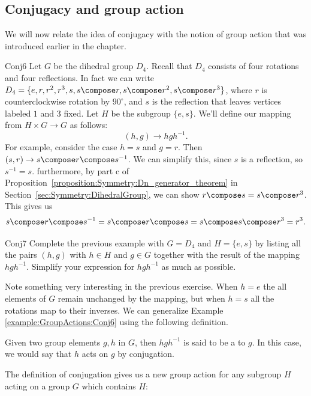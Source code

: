 \subsection{Conjugacy and group action}
\label{subsec:GroupActions:Conjugation:ConjugacyAndGroupAction}

We will now relate the idea of conjugacy with the notion of group action that was introduced earlier in the chapter.


\begin{example}{Conj6}
Let $G$ be the dihedral group $D_4$.  Recall that $D_4$ consists of four rotations and four reflections.  In fact we can write $D_4=\{e, r, r^2, r^3, s,s\compose r,s\compose r^2,s\compose r^3\}$, where $r$ is counterclockwise rotation by $90^{\circ}$, and $s$ is the reflection that leaves vertices labeled $1$ and $3$ fixed.  Let $H$ be the subgroup $\{e,s\}$.  
We'll define our mapping from $H\times G \rightarrow G$ as follows:
$$(h,g) \rightarrow hgh^{-1}. $$
For example, consider the case $h=s$ and $g=r$. Then $(s,r) \rightarrow s\compose r \compose s^{-1}$.  We can simplify this, since $s$ is a reflection, so $s^{-1}=s$.  furthermore, by part c of Proposition~\ref{proposition:Symmetry:Dn_generator_theorem}  in Section~\ref{sec:Symmetry:DihedralGroup}, we can show $r\compose s =s\compose r^3$.  This gives us
$$ s\compose r\compose s^{-1}=s\compose r\compose s=s\compose s\compose r^3=r^3.$$

\end {example}
\begin{exercise}{Conj7}
Complete the previous example with $G=D_4$ and $H=\{e,s\}$ by listing all the pairs $(h,g)$ with $h\in H$ and $g \in G$ together with the result of the mapping $hgh^{-1}$.  Simplify your expression for $hgh^{-1}$ as much as possible.
\end{exercise}
Note something very interesting in the previous exercise.  When $h=e$ the all elements of $G$ remain unchanged by the mapping, but when $h=s$ all the rotations map to their inverses.
 We can generalize Example \ref{example:GroupActions:Conj6} using the following definition.

\begin{defn}
Given two group elements $g,h$ in $G$, then $hgh^{-1}$ is said to be a  to $g$. In this case, we would say that $h$ acts on $g$ by conjugation.
\end{defn}
The definition of conjugation gives us a new group action for any subgroup $H$ acting on a group $G$ which contains $H$:

